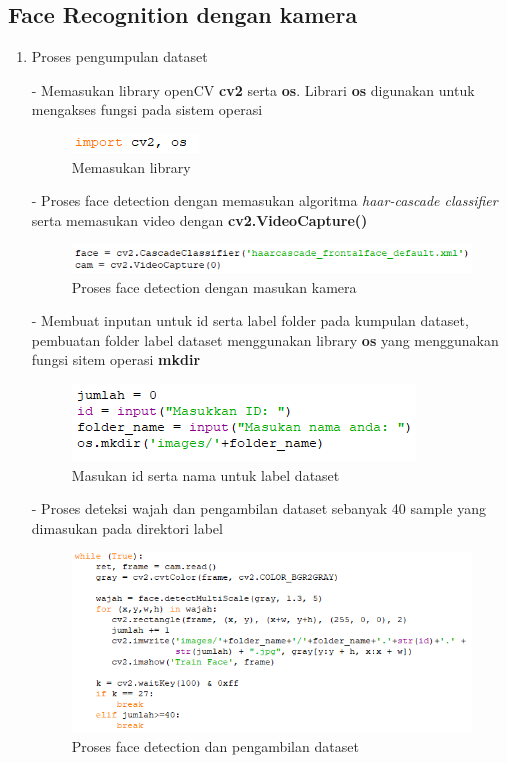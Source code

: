 \subsection{Face Recognition dengan kamera}
\begin{enumerate}
    \item Proses pengumpulan dataset
    
    - Memasukan library openCV \textbf{cv2} serta \textbf{os}. Librari \textbf{os}
    digunakan untuk mengakses fungsi pada sistem operasi
    \begin{figure}[h!]
        \centering
        \includegraphics[width=0.3\linewidth]{images/fr_cam1.PNG}
        \caption{Memasukan library }
    \end{figure}

    - Proses face detection dengan memasukan algoritma \emph{haar-cascade classifier} serta
     memasukan video dengan \textbf{cv2.VideoCapture()}
     \begin{figure}[h!]
        \centering
        \includegraphics[width=0.9\linewidth]{images/fr_cam2.PNG}
        \caption{Proses face detection dengan masukan kamera}
    \end{figure}

    - Membuat inputan untuk id serta label folder pada kumpulan dataset, pembuatan folder label dataset menggunakan 
    library \textbf{os} yang menggunakan fungsi sitem operasi \textbf{mkdir}
    \begin{figure}[h!]
        \centering
        \includegraphics[width=0.7\linewidth]{images/fr_cam3.PNG}
        \caption{Masukan id serta nama untuk label dataset}
    \end{figure}

    - Proses deteksi wajah dan pengambilan dataset sebanyak 40 sample yang dimasukan pada direktori label
    \begin{figure}[h!]
        \centering
        \includegraphics[width=0.9\linewidth]{images/fr_cam4.PNG}
        \caption{Proses face detection dan pengambilan dataset}
    \end{figure}


\end{enumerate}
